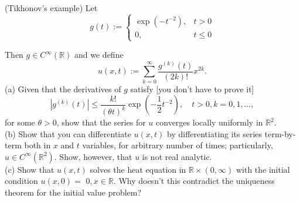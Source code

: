 \newpage
\begin{problem}
	(Tikhonov's example) Let
\[
g(t):= \begin{cases}\exp \left(-t^{-2}\right), & t>0 \\ 0, & t \leq 0\end{cases}
\]

Then $g \in C^{\infty}(\mathbb{R})$ and we define
\[
u(x, t):=\sum_{k=0}^{\infty} \frac{g^{(k)}(t)}{(2 k) !} x^{2 k} .
\]
(a) Given that the derivatives of $g$ satisfy [you don't have to prove it]
\[
\left|g^{(k)}(t)\right| \leq \frac{k !}{(\theta t)^k} \exp \left(-\frac{1}{2} t^{-2}\right), \quad t>0, k=0,1, \ldots,
\]
for some $\theta>0$, show that the series for $u$ converges locally uniformly in $\mathbb{R}^2$.\\
(b) Show that you can differentiate $u(x, t)$ by differentiating its series term-by-term both in $x$ and $t$ variables, for arbitrary number of times; particularly, $u \in C^{\infty}\left(\mathbb{R}^2\right)$. Show, however, that $u$ is not real analytic.\\
(c) Show that $u(x, t)$ solves the heat equation in $\mathbb{R} \times(0, \infty)$ with the initial condition $u(x, 0)=$ $0, x \in \mathbb{R}$. Why doesn't this contradict the uniqueness theorem for the initial value problem?
\end{problem}
